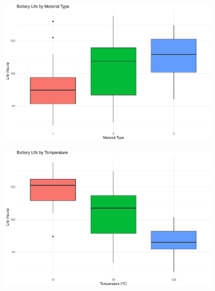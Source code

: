 \documentclass[
  letterpaper,
]{scrbook}
\begin{document}
\begin{figure}

\begin{minipage}{0.50\linewidth}

\begin{figure}[H]

{\centering \includegraphics{unit6-factorial/factorial_files/figure-pdf/plot-boxplots-1.pdf}

}


\end{figure}%

\end{minipage}%
%
\begin{minipage}{0.50\linewidth}

\begin{figure}[H]

{\centering \includegraphics{unit6-factorial/factorial_files/figure-pdf/plot-boxplots-2.pdf}

}


\end{figure}%

\end{minipage}%

\end{figure}%
\end{document}
